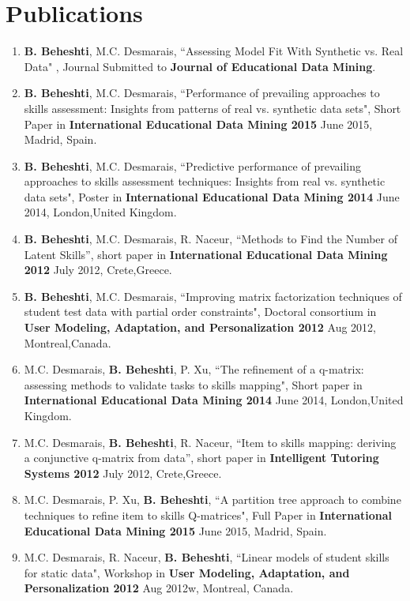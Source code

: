 \section{Publications}
\begin{enumerate}

\item \textbf{B. Beheshti}, M.C. Desmarais, “Assessing Model Fit With Synthetic vs. Real Data" , Journal Submitted to \textbf{Journal of Educational Data Mining}.

\item \textbf{B. Beheshti}, M.C. Desmarais, “Performance of prevailing approaches to skills assessment: Insights from patterns of real vs. synthetic data sets", Short Paper  in \textbf{International Educational Data Mining 2015} June 2015, Madrid, Spain.

\item \textbf{B. Beheshti}, M.C. Desmarais, “Predictive performance of prevailing approaches to skills assessment techniques: Insights from real vs. synthetic data sets", Poster in \textbf{International Educational Data Mining 2014} June 2014, London,United Kingdom.

\item \textbf{B. Beheshti}, M.C. Desmarais, R. Naceur, “Methods to Find the Number of Latent Skills”, short paper in \textbf{International Educational Data Mining 2012} July 2012, Crete,Greece.

\item \textbf{B. Beheshti}, M.C. Desmarais, “Improving matrix factorization techniques of student test data with partial order constraints", Doctoral consortium in \textbf{User Modeling, Adaptation, and Personalization 2012} Aug 2012, Montreal,Canada.

\item M.C. Desmarais, \textbf{B. Beheshti}, P. Xu, “The refinement of a q-matrix: assessing methods to validate tasks to skills mapping", Short paper in \textbf{International Educational Data Mining 2014} June 2014, London,United Kingdom.

\item M.C. Desmarais, \textbf{B. Beheshti}, R. Naceur, “Item to skills mapping: deriving a conjunctive q-matrix from data”, short paper in \textbf{Intelligent Tutoring Systems 2012} July 2012, Crete,Greece.

\item M.C. Desmarais, P. Xu, \textbf{B. Beheshti}, “A partition tree approach to combine techniques to refine item to skills Q-matrices", Full Paper  in \textbf{International Educational Data Mining 2015} June 2015, Madrid, Spain.

\item M.C. Desmarais, R. Naceur, \textbf{B. Beheshti}, “Linear models of student skills for static data", Workshop in \textbf{User Modeling, Adaptation, and Personalization 2012} Aug 2012w, Montreal, Canada.
\end{enumerate}


